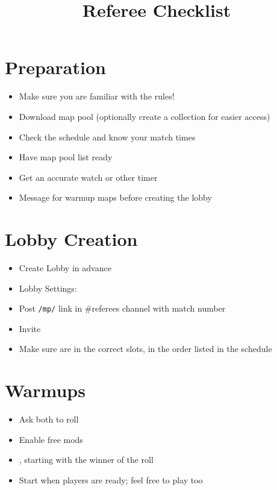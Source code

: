 \title{\nameshort{} Referee Checklist}
\author{}
\date{}



\maketitle

\section{Preparation}
\begin{itemize}
	\item Make sure you are familiar with the rules!
	\item Download map pool (optionally create a collection for easier access)
	\item Check the schedule and know your match times
	\item Have map pool list ready
	\item Get an accurate watch or other timer
	\item Message  for warmup maps before creating the lobby
\end{itemize}

\section{Lobby Creation}

\begin{itemize}
	\item Create Lobby \lobbyopen{} in advance
	\item Lobby Settings:
	
	\item Post \texttt{/mp/} link in \#referees channel with match number
	\item Invite 
	\item Make sure  are in the correct slots, in the order listed in the schedule
\end{itemize}

\section{Warmups}

\begin{itemize}
	\item Ask both  to roll
	\item Enable free mods
	\item {}, starting with the winner of the roll
	\item Start when players are ready; feel free to play too
\end{itemize}

